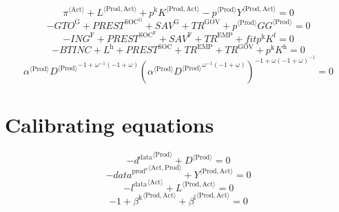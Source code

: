 \begin{equation}
{\pi}^{\langle \mathrm{Act}\rangle} + {L}^{\langle \mathrm{Prod},\mathrm{Act}\rangle} + {p^{\mathrm{k}}} {{K}^{\langle \mathrm{Prod},\mathrm{Act}\rangle}} - {{p}^{\langle \mathrm{Prod}\rangle}} {{Y}^{\langle \mathrm{Prod},\mathrm{Act}\rangle}} = 0
\end{equation}
\begin{equation}
-{G\!T\!O}^{\mathrm{G}} + {P\!R\!E\!S\!T}^{\mathrm{SOC}^{\mathrm{G}}} + {S\!A\!V}^{\mathrm{G}} + {T\!R}^{\mathrm{GOV}} + {{p}^{\langle \mathrm{Prod}\rangle}} {{{G\!G}}^{\langle \mathrm{Prod}\rangle}} = 0
\end{equation}
\begin{equation}
-{I\!N\!G}^{\mathrm{F}} + {P\!R\!E\!S\!T}^{\mathrm{SOC}^{\mathrm{F}}} + {S\!A\!V}^{\mathrm{F}} + {T\!R}^{\mathrm{EMP}} + {{f\!i\!t}} {p^{\mathrm{k}}} {K^{\mathrm{f}}} = 0
\end{equation}
\begin{equation}
-{B\!T\!I\!N\!C} + L^{\mathrm{h}} + {P\!R\!E\!S\!T}^{\mathrm{SOC}} + {T\!R}^{\mathrm{EMP}} + {T\!R}^{\mathrm{GOV}} + {p^{\mathrm{k}}} {K^{\mathrm{h}}} = 0
\end{equation}
\begin{equation}
{{\alpha}^{\langle \mathrm{\mathrm{Prod}}\rangle}} {{{D}^{\langle \mathrm{Prod}\rangle}}^{-1 + {\omega}^{-1} \left(-1 + \omega\right)}} {\left({{\alpha}^{\langle \mathrm{\mathrm{Prod}}\rangle}} {{{D}^{\langle \mathrm{Prod}\rangle}}^{{\omega}^{-1} \left(-1 + \omega\right)}}\right)^{-1 + {\omega} \left(-1 + \omega\right)^{-1}}} = 0
\end{equation}



\section{Calibrating equations}

\begin{equation}
-{d^{\mathrm{data}}}^{\langle \mathrm{\mathrm{Prod}}\rangle} + {D}^{\langle \mathrm{Prod}\rangle} = 0
\end{equation}
\begin{equation}
-{{d\!a\!t\!a}^{\mathrm{prod}^{\mathrm{s}}}}^{\langle \mathrm{\mathrm{Act}},\mathrm{\mathrm{Prod}}\rangle} + {Y}^{\langle \mathrm{Prod},\mathrm{Act}\rangle} = 0
\end{equation}
\begin{equation}
-{l^{\mathrm{data}}}^{\langle \mathrm{\mathrm{Act}}\rangle} + {L}^{\langle \mathrm{Prod},\mathrm{Act}\rangle} = 0
\end{equation}
\begin{equation}
-1 + {\beta^{\mathrm{k}}}^{\langle \mathrm{\mathrm{Prod}},\mathrm{\mathrm{Act}}\rangle} + {\beta^{\mathrm{l}}}^{\langle \mathrm{\mathrm{Prod}},\mathrm{\mathrm{Act}}\rangle} = 0
\end{equation}





